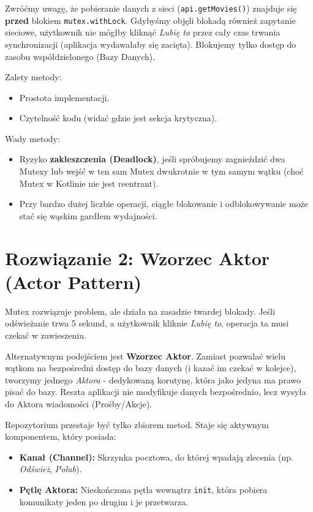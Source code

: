 Zwróćmy uwagę, że pobieranie danych z sieci (\texttt{api.getMovies()}) znajduje się \textbf{przed} blokiem \texttt{mutex.withLock}. Gdybyśmy objęli blokadą również zapytanie sieciowe, użytkownik nie mógłby kliknąć \textit{Lubię to} przez cały czas trwania synchronizacji (aplikacja wydawałaby się zacięta). Blokujemy tylko dostęp do zasobu współdzielonego (Bazy Danych).

Zalety metody:
\begin{itemize}
    \item Prostota implementacji.
    \item Czytelność kodu (widać gdzie jest sekcja krytyczna).
\end{itemize}

Wady metody:
\begin{itemize}
    \item Ryzyko \textbf{zakleszczenia (Deadlock)}, jeśli spróbujemy zagnieździć dwa Mutexy lub wejść w ten sam Mutex dwukrotnie w tym samym wątku (choć Mutex w Kotlinie nie jest reentrant).
    \item Przy bardzo dużej liczbie operacji, ciągłe blokowanie i odblokowywanie może stać się wąskim gardłem wydajności.
\end{itemize}

\section{Rozwiązanie 2: Wzorzec Aktor (Actor Pattern)}

Mutex rozwiązuje problem, ale działa na zasadzie twardej blokady. Jeśli odświeżanie trwa 5 sekund, a użytkownik kliknie \textit{Lubię to}, operacja ta musi czekać w zawieszeniu.

Alternatywnym podejściem jest \textbf{Wzorzec Aktor}. Zamiast pozwalać wielu wątkom na bezpośredni dostęp do bazy danych (i kazać im czekać w kolejce), tworzymy jednego \textit{Aktora} - dedykowaną korutynę, która jako jedyna ma prawo pisać do bazy. Reszta aplikacji nie modyfikuje danych bezpośrednio, lecz wysyła do Aktora wiadomości (Prośby/Akcje).

Repozytorium przestaje być tylko zbiorem metod. Staje się aktywnym komponentem, który posiada:
\begin{itemize}
    \item \textbf{Kanał (Channel):} Skrzynka pocztowa, do której wpadają zlecenia (np. \textit{Odśwież}, \textit{Polub}).
    \item \textbf{Pętlę Aktora:} Nieskończona pętla wewnątrz \texttt{init}, która pobiera komunikaty jeden po drugim i je przetwarza.
\end{itemize}

